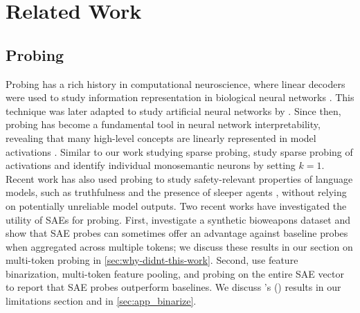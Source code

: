 \section{Related Work}
\label{sec:app-related-work}

\subsection{Probing}
Probing has a rich history in computational neuroscience, where linear decoders were used to study information representation in biological neural networks \cite{mur2009revealing}. This technique was later adapted to study artificial neural networks by \citet{alain2016understanding}. Since then, probing has become a fundamental tool in neural network interpretability, revealing that many high-level concepts are linearly represented in model activations \cite{space_time, monotonic_numeric_representations, othello_neel_linear}. Similar to our work studying sparse probing, \citet{gurnee2023finding} study sparse probing of activations and identify individual monosemantic neurons by setting $k = 1$. Recent work has also used probing to study safety-relevant properties of language models, such as truthfulness \cite{linear_truth_sam} and the presence of sleeper agents \cite{macdiarmid2024sleeperagentprobes}, without relying on potentially unreliable model outputs. Two recent works have investigated the utility of SAEs for probing. First, \citet{bricken2024features_classifiers} investigate a synthetic bioweapons dataset and show that SAE probes can sometimes offer an advantage against baseline probes when aggregated across multiple tokens; we discuss these results in our section on multi-token probing in \cref{sec:why-didnt-this-work}. Second, \citet{probingGallifant} use feature binarization, multi-token feature pooling, and probing on the entire SAE vector to report that SAE probes outperform baselines. We discuss \citeauthor{probingGallifant}'s (\citeyear{probingGallifant}) results in our limitations section and in \cref{sec:app_binarize}.

